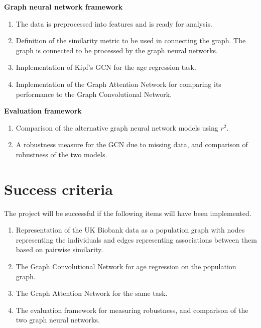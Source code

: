\documentclass[12pt,a4paper,twoside]{article}
\begin{document}
\textbf{Graph neural network framework}
\begin{enumerate}[label=G\arabic*.]
  \item The data is preprocessed into features and is ready for analysis. %
  \item Definition of the similarity metric to be used in connecting the graph. The graph is connected to be processed by the graph neural networks.
  \item Implementation of Kipf's GCN \cite{kipf2017semi} for the age regression task.
  \item Implementation of the Graph Attention Network for comparing its performance to the Graph Convolutional Network.
\end{enumerate}

\textbf{Evaluation framework}

\begin{enumerate}[label=E\arabic*.]
  \item  Comparison of the alternative graph neural network models using $r^2$.
  \item A robustness measure for the GCN due to missing data, and comparison of robustness of the two models.
\end{enumerate}

\section*{Success criteria}
The project will be successful if the following items will have been implemented.
\begin{enumerate}[label=SC\arabic*.]
  \item Representation of the UK Biobank data as a population graph with nodes representing the individuals and edges representing associations between them based on pairwise similarity.
  \item The Graph Convolutional Network for age regression on the population graph.
  \item The Graph Attention Network for the same task.
  \item The evaluation framework for measuring robustness, and comparison of the two graph neural networks.
\end{enumerate}
\end{document}
